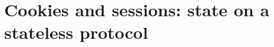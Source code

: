 \chapter{Cookies and sessions: state on a stateless protocol}
\label{ch:cookies-and-sessions-state-on-a}

